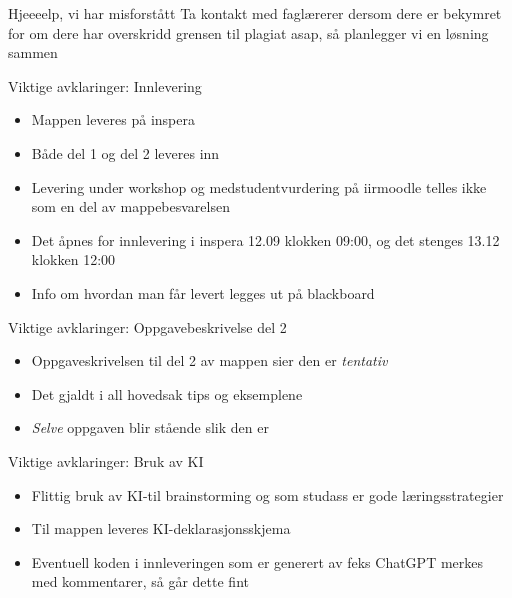 \documentclass[aspectratio=169]{beamer}
\begin{document}
\begin{frame}{Hjeeeelp, vi har misforstått}
   \huge
   Ta kontakt med faglærerer dersom dere er bekymret for om dere har overskridd grensen til plagiat asap, så planlegger vi en løsning sammen
\end{frame}


\begin{frame}{Viktige avklaringer: Innlevering}
   \begin{itemize}
      \item {Mappen leveres på inspera}
      \item {Både del 1 og del 2 leveres inn}
      \item {Levering under workshop og medstudentvurdering på iirmoodle telles ikke som en del av mappebesvarelsen}
      \item {Det åpnes for innlevering i inspera 12.09 klokken 09:00, og det stenges 13.12 klokken 12:00}
      \item {Info om hvordan man får levert legges ut på blackboard}
   \end{itemize}
\end{frame}

\begin{frame}{Viktige avklaringer: Oppgavebeskrivelse del 2}
   \begin{itemize}
      \item {Oppgaveskrivelsen til del 2 av mappen sier den er \textit{tentativ}}
      \item {Det gjaldt i all hovedsak tips og eksemplene}
      \item {\textit{Selve} oppgaven blir stående slik den er}
   \end{itemize}
\end{frame}

\begin{frame}{Viktige avklaringer: Bruk av KI}
   \begin{itemize}
      \item {Flittig bruk av KI-til brainstorming og som studass er gode læringsstrategier}
      \item {Til mappen leveres KI-deklarasjonsskjema}
      \item {Eventuell koden i innleveringen som er generert av feks ChatGPT merkes med kommentarer, så går dette fint}
   \end{itemize}
\end{frame}
\end{document}
